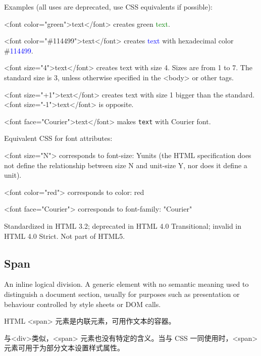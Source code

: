 Examples (all uses are deprecated, use CSS equivalents if possible):

\begin{compactitem}
\item <font color="green">text</font> creates green \textcolor{Green}{text}.
\item <font color="\#114499">text</font> creates \textcolor{Blue}{text} with hexadecimal color \#\textcolor{Blue}{114499}.
\item <font size="4">text</font> creates {\Large{text}} with size 4. Sizes are from 1 to 7. The standard size is 3, unless otherwise specified in the <body> or other tags.
\item <font size="+1">text</font> creates {\large{text with size 1 bigger than the standard}}. <font size="-1">text</font> is {\small{opposite}}.
\item <font face="Courier">text</font> makes \texttt{text} with Courier font.
\end{compactitem}

Equivalent CSS for font attributes:

\begin{compactitem}
\item <font size="N"> corresponds to {font-size: Yunits} (the HTML specification does not define the relationship between size N and unit-size Y, nor does it define a unit).
\item <font color="red"> corresponds to {color: red}
\item <font face="Courier"> corresponds to {font-family: "Courier"}
\end{compactitem}

Standardized in HTML 3.2; deprecated in HTML 4.0 Transitional; invalid in HTML 4.0 Strict. Not part of HTML5.



\subsection{Span}

An inline logical division. A generic element with no semantic meaning used to distinguish a document section, usually for purposes such as presentation or behaviour controlled by style sheets or DOM calls.

HTML <span> 元素是内联元素，可用作文本的容器。

与<div>类似，<span> 元素也没有特定的含义。当与 CSS 一同使用时，<span> 元素可用于为部分文本设置样式属性。



